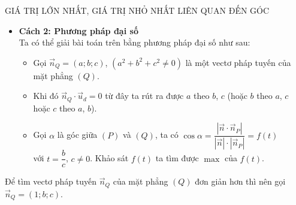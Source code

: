 \begin{dang}{GIÁ TRỊ LỚN NHẤT, GIÁ TRỊ NHỎ NHẤT LIÊN QUAN ĐẾN GÓC}
\begin{itemize}
		\item \textbf{Cách 2: Phương pháp đại số}\\
		Ta có thể giải bài toán trên bằng phương pháp đại số như sau:\\
		\begin{itemize}
			\item Gọi $\overrightarrow{n}_Q=(a;b;c)$, $(a^2+b^2+c^2 \ne 0)$ là một vectơ pháp tuyến của mặt phẳng $(Q)$.
			\item Khi đó $\overrightarrow{n}_Q \cdot \overrightarrow{u}_d=0$ từ đây ta rút ra được $a$ theo $b$, $c$ (hoặc $b$ theo $a$, $c$ hoặc $c$ theo $a$, $b$).
			\item Gọi $\alpha$ là góc giữa $(P)$ và $(Q)$, ta có $\cos \alpha =\dfrac{|\overrightarrow{n} \cdot \overrightarrow{n}_P|}{|\overrightarrow{n}| \cdot |\overrightarrow{n}_P|}=f(t)$\\
			với $t=\dfrac{b}{c}$, $c \ne 0$. Khảo sát $f(t)$ ta tìm được $\max$ của $f(t)$.
		\end{itemize}
	\end{itemize}
	\begin{note}
		Để tìm vectơ pháp tuyến $\overrightarrow{n}_Q$ của mặt phẳng $(Q)$ đơn giản hơn thì nên gọi $\overrightarrow{n}_Q=(1;b;c)$.
	\end{note}
	

\end{dang}
